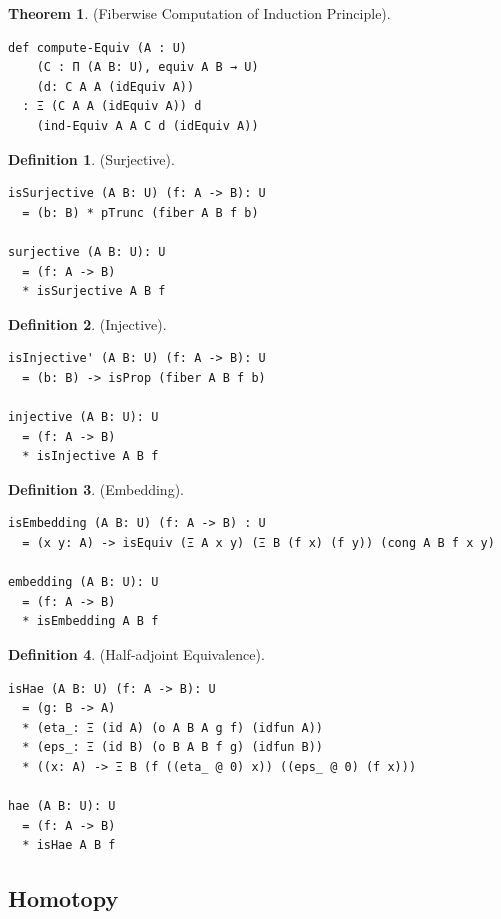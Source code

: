 \documentclass{article}
\theoremstyle{definition}
\newtheorem{definition}{Definition}
\newtheorem{theorem}{Theorem}
\begin{document}
\begin{theorem} (Fiberwise Computation of Induction Principle).
\begin{lstlisting}
def compute-Equiv (A : U)
    (C : Π (A B: U), equiv A B → U)
    (d: C A A (idEquiv A))
  : Ξ (C A A (idEquiv A)) d
    (ind-Equiv A A C d (idEquiv A))
\end{lstlisting}
\end{theorem}

\begin{definition} (Surjective).
\begin{lstlisting}
isSurjective (A B: U) (f: A -> B): U
  = (b: B) * pTrunc (fiber A B f b)

surjective (A B: U): U
  = (f: A -> B)
  * isSurjective A B f
\end{lstlisting}
\end{definition}

\begin{definition} (Injective).
\begin{lstlisting}
isInjective' (A B: U) (f: A -> B): U
  = (b: B) -> isProp (fiber A B f b)

injective (A B: U): U
  = (f: A -> B)
  * isInjective A B f
\end{lstlisting}
\end{definition}

\begin{definition} (Embedding).
\begin{lstlisting}
isEmbedding (A B: U) (f: A -> B) : U
  = (x y: A) -> isEquiv (Ξ A x y) (Ξ B (f x) (f y)) (cong A B f x y)

embedding (A B: U): U
  = (f: A -> B)
  * isEmbedding A B f
\end{lstlisting}
\end{definition}

\begin{definition} (Half-adjoint Equivalence).
\begin{lstlisting}
isHae (A B: U) (f: A -> B): U
  = (g: B -> A)
  * (eta_: Ξ (id A) (o A B A g f) (idfun A))
  * (eps_: Ξ (id B) (o B A B f g) (idfun B))
  * ((x: A) -> Ξ B (f ((eta_ @ 0) x)) ((eps_ @ 0) (f x)))

hae (A B: U): U
  = (f: A -> B)
  * isHae A B f
\end{lstlisting}
\end{definition}

\newpage
\subsection{Homotopy}
\end{document}
